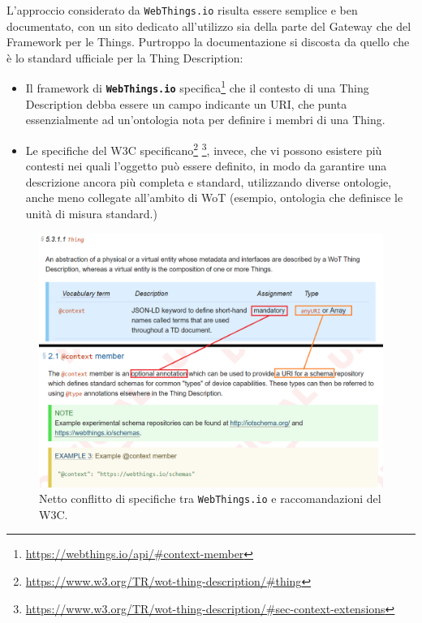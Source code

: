 \documentclass[12pt,a4paper,openright,oneside]{report}
\begin{document}
L'approccio considerato da \texttt{WebThings.io} risulta essere semplice e ben documentato, con un sito dedicato all'utilizzo sia della parte del Gateway che del Framework per le Things. Purtroppo la documentazione si discosta da quello che è lo standard ufficiale per la Thing Description:

\begin{itemize}
	\item Il framework di \textbf{\texttt{WebThings.io}} specifica\footnote{\url{https://webthings.io/api/\#context-member}} che il contesto di una Thing Description debba essere un campo indicante un URI, che punta essenzialmente ad un'ontologia nota per definire i membri di una Thing.
	
	\item Le specifiche del W3C specificano\footnote{\url{https://www.w3.org/TR/wot-thing-description/\#thing}} \footnote{\url{https://www.w3.org/TR/wot-thing-description/\#sec-context-extensions}}, invece, che vi possono esistere più contesti nei quali l'oggetto può essere definito, in modo da garantire una descrizione ancora più completa e standard, utilizzando diverse ontologie, anche meno collegate all'ambito di WoT (esempio, ontologia che definisce le unità di misura standard.)
\end{itemize}

\begin{figure}[h]
	\centering
	\includegraphics[scale=0.55]{eps/specification-conflict.png}
	\caption{Netto conflitto di specifiche tra \texttt{WebThings.io} e raccomandazioni del W3C.}
	\label{fig:specification-conflict}
\end{figure}
\end{document}
